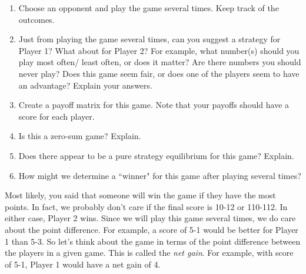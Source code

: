 \begin{enumerate}
\item Choose an opponent and play the game several times. Keep track of the outcomes.

\item Just from playing the game several times, can you suggest a strategy for Player 1? What about for Player 2? For example, what number(s) should you play most often/ least often, or does it matter? Are there numbers you should never play? Does this game seem fair, or does one of the players seem to have an advantage? Explain your answers.

\item Create a payoff matrix for this game. Note that your payoffs should have a score for each player. 

\item Is this a zero-sum game? Explain.

\item Does there appear to be a pure strategy equilibrium for this game? Explain.

\item How might we determine a ``winner" for this game after playing several times? 

\end{enumerate}
Most likely, you said that someone will win the game if they have the most points. In fact, we probably don't care if the final score is 10-12 or 110-112. In either case, Player 2 wins. Since we will play this game several times, we do care about the point difference. For example, a score of 5-1 would be better for Player 1 than 5-3. So let's think about the game in terms of the point difference between the players in a given game. This is called the {\it net gain}. For example, with score of 5-1, Player 1 would have a net gain of 4.

